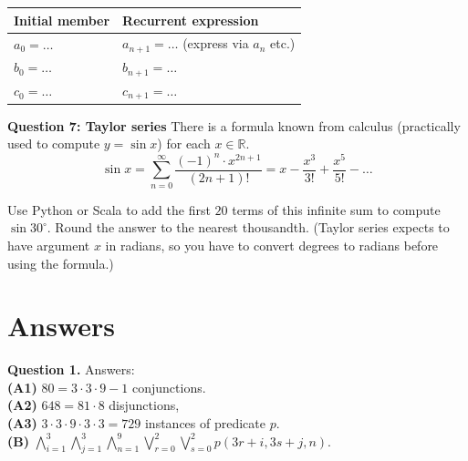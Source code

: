 \documentclass[jou]{apa6}
\begin{document}
\begin{tabular}{|l|l|} \hline
{\bf Initial member} & {\bf Recurrent expression} \\ \hline
$a_0 = \ldots$ & $a_{n+1} = \ldots$ (express via $a_n$ etc.) \\ \hline
$b_0 = \ldots$ & $b_{n+1} = \ldots$ \\ \hline 
$c_0 = \ldots$ & $c_{n+1} = \ldots$ \\ \hline 
\end{tabular}

\vspace{6pt}
{\bf Question 7: Taylor series} There is a formula known from calculus (practically 
used to compute $y = \sin x$) for each $x \in \mathbb{R}$. 
$$\sin x = \sum\limits_{n=0}^{\infty} \frac{(-1)^n \cdot x^{2n+1}}{(2n+1)!} = x - \frac{x^3}{3!}
+ \frac{x^5}{5!} - \ldots$$

Use Python or Scala to add the first $20$ terms of this infinite sum
to compute $\sin 30^{\circ}$. Round the answer
to the nearest thousandth.
(Taylor series expects to have argument $x$ in radians, so you have to convert degrees to radians 
before using the formula.)

\newpage

\section{Answers}

\vspace{6pt}
{\bf Question 1.} Answers:\\ 
{\bf (A1)} $80 = 3 \cdot 3 \cdot 9 - 1$ conjunctions.\\
{\bf (A2)} $648 = 81 \cdot 8$ disjunctions,\\
{\bf (A3)} $3 \cdot 3 \cdot 9 \cdot 3 \cdot 3 = 729$ instances of predicate $p$.\\
{\bf (B)} $\bigwedge\limits_{i = 1}^{3} \bigwedge\limits_{j = 1}^{3} \bigwedge\limits_{n = 1}^{9}
\bigvee\limits_{r = 0}^{2} \bigvee\limits_{s = 0}^{2} p(3r+i, 3s+j, n).$
\end{document}
